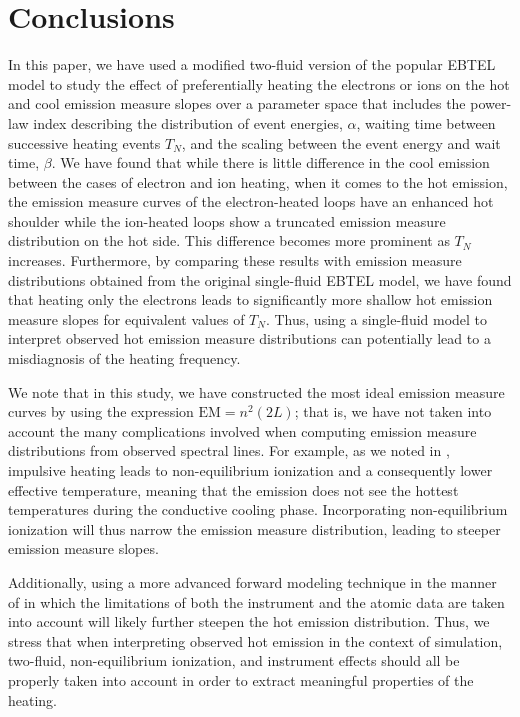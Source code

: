 \documentclass[apj]{emulateapj}
\begin{document}
	\section{Conclusions}
	\label{sec:conclusions}
	\par In this paper, we have used a modified two-fluid version of the popular EBTEL model to study the effect of preferentially heating the electrons or ions on the hot and cool emission measure slopes over a parameter space that includes the power-law index describing the distribution of event energies, $\alpha$, waiting time between successive heating events $T_N$, and the scaling between the event energy and wait time, $\beta$. We have found that while there is little difference in the cool emission between the cases of electron and ion heating, when it comes to the hot emission, the emission measure curves of the electron-heated loops have an enhanced hot shoulder while the ion-heated loops show a truncated emission measure distribution on the hot side. This difference becomes more prominent as $T_N$ increases. Furthermore, by comparing these results with emission measure distributions obtained from the original single-fluid EBTEL model, we have found that heating only the electrons leads to significantly more shallow hot emission measure slopes for equivalent values of $T_N$. Thus, using a single-fluid model to interpret observed hot emission measure distributions can potentially lead to a misdiagnosis of the heating frequency.
	\par We note that in this study, we have constructed the most ideal emission measure curves by using the expression $\mathrm{EM}=n^2(2L)$; that is, we have not taken into account the many complications involved when computing emission measure distributions from observed spectral lines. For example, as we noted in , impulsive heating leads to non-equilibrium ionization and a consequently lower effective temperature, meaning that the emission does not see the hottest temperatures during the conductive cooling phase. Incorporating non-equilibrium ionization will thus narrow the emission measure distribution, leading to steeper emission measure slopes.
	\par Additionally, using a more advanced forward modeling technique in the manner of \citet{bradshaw_what_2011} in which the limitations of both the instrument and the atomic data are taken into account will likely further steepen the hot emission distribution. Thus, we stress that when interpreting observed hot emission in the context of simulation, two-fluid, non-equilibrium ionization, and instrument effects should all be properly taken into account in order to extract meaningful properties of the heating.
\end{document}
